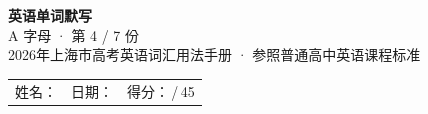 \documentclass[10pt,a4paper]{article}
\begin{document}
\pagestyle{plain}

\begin{center}
{\LARGE\bfseries 英语单词默写}\\[0.22em]
{\large A 字母 · 第 4 / 7 份}\\[0.18em]
{\small 2026年上海市高考英语词汇用法手册 · 参照普通高中英语课程标准}
\end{center}

\vspace{0.25em}
\noindent\begin{tabular}{@{}p{}@{}p{}@{}p{}@{}}
姓名：\underline{\hspace{2.0cm}} & 日期：\underline{\hspace{2.0cm}} & 得分：\underline{\hspace{1.3cm}}\,/\,45 \\
\end{tabular}

\vspace{0.3em}

\vspace{0.08em}
\end{document}
